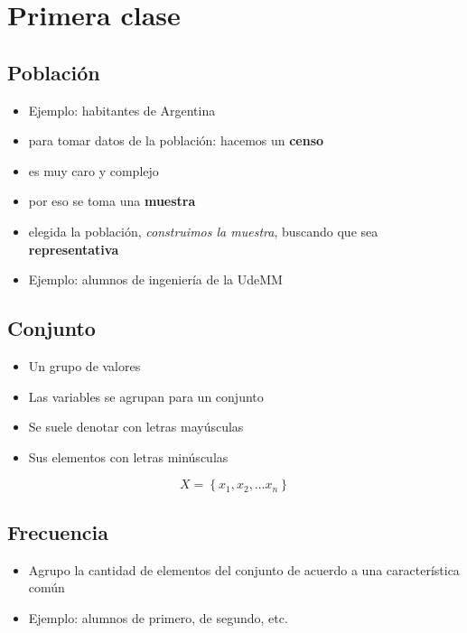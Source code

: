\section{Primera clase}

\subsection{Población}

\begin{itemize}
    \item Ejemplo: habitantes de Argentina
    \item para tomar datos de la población: hacemos un \textbf{censo}
    \item es muy caro y complejo
    \item por eso se toma una \textbf{muestra}
    \item elegida la población, \textit{construimos la muestra}, buscando que 
    sea \textbf{representativa}
    \item Ejemplo: alumnos de ingeniería de la UdeMM
\end{itemize}

\subsection{Conjunto}
\begin{itemize}
    \item Un grupo de valores
    \item Las variables se agrupan para un conjunto
    \item Se suele denotar con letras mayúsculas
    \item Sus elementos con letras minúsculas
\end{itemize}

\begin{equation*}
    X = \left\{x_1, x_2, \dots x_n\right\}
\end{equation*}

\subsection{Frecuencia}
\begin{itemize}
    \item Agrupo la cantidad de elementos del conjunto de acuerdo a una 
    característica común
    \item Ejemplo: alumnos de primero, de segundo, etc.
\end{itemize}

